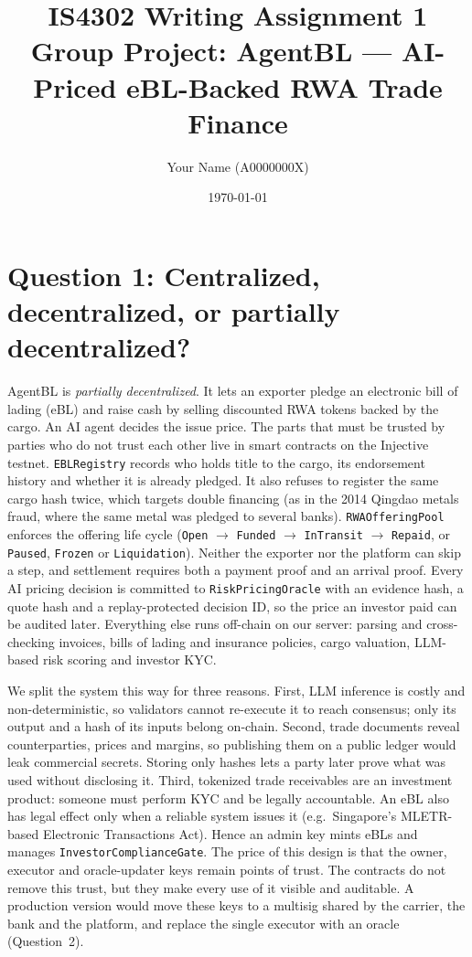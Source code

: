 \documentclass[11pt,a4paper]{article}
\title{IS4302 Writing Assignment 1\\[0.3em]\large Group Project: AgentBL --- AI-Priced eBL-Backed RWA Trade Finance}
\author{Your Name (A0000000X)}
\date{\today}
\newcommand{\code}[1]{\texttt{#1}}
\begin{document}
\maketitle

\section*{Question 1: Centralized, decentralized, or partially decentralized?}

AgentBL is \emph{partially decentralized}. It lets an exporter pledge an
electronic bill of lading (eBL) and raise cash by selling discounted RWA tokens
backed by the cargo. An AI agent decides the issue price. The parts that must be
trusted by parties who do not trust each other live in smart contracts on the
Injective testnet. \code{EBLRegistry} records who holds title to the cargo, its
endorsement history and whether it is already pledged. It also refuses to
register the same cargo hash twice, which targets double financing (as in the
2014 Qingdao metals fraud, where the same metal was pledged to several banks).
\code{RWAOfferingPool} enforces the offering life cycle (\code{Open} $\to$
\code{Funded} $\to$ \code{InTransit} $\to$ \code{Repaid}, or \code{Paused},
\code{Frozen} or \code{Liquidation}). Neither the exporter nor the platform can
skip a step, and settlement requires both a payment proof and an arrival proof.
Every AI pricing decision is committed to \code{RiskPricingOracle} with an
evidence hash, a quote hash and a replay-protected decision ID, so the price an
investor paid can be audited later. Everything else runs off-chain on our
server: parsing and cross-checking invoices, bills of lading and insurance
policies, cargo valuation, LLM-based risk scoring and investor KYC.

We split the system this way for three reasons. First, LLM inference is costly
and non-deterministic, so validators cannot re-execute it to reach consensus;
only its output and a hash of its inputs belong on-chain. Second, trade
documents reveal counterparties, prices and margins, so publishing them on a
public ledger would leak commercial secrets. Storing only hashes lets a party
later prove what was used without disclosing it. Third, tokenized trade
receivables are an investment product: someone must perform KYC and be legally
accountable. An eBL also has legal effect only when a reliable system issues it
(e.g.\ Singapore's MLETR-based Electronic Transactions Act). Hence an admin key
mints eBLs and manages \code{InvestorComplianceGate}. The price of this design
is that the owner, executor and oracle-updater keys remain points of trust. The
contracts do not remove this trust, but they make every use of it visible and
auditable. A production version would move these keys to a multisig shared by
the carrier, the bank and the platform, and replace the single executor with an
oracle (Question~2).
\end{document}
